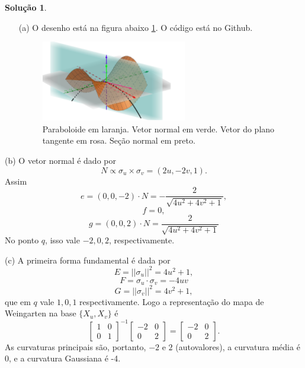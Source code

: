 \documentclass[a4paper,12pt]{article}
\theoremstyle{exer}
\theoremstyle{definition}
\newtheorem{solution}{Solução}
\theoremstyle{plain}
\begin{document}
\begin{solution}
    \begin{enumerate}
        \item[(a)] O desenho está na figura abaixo \ref{fig:paraboloid}. O
        código está no Github. 
        
        \begin{figure}[!ht]
            \centering
            \includegraphics[width=0.6\textwidth]{images/paraboloide.png}
            \caption{Paraboloide em laranja. Vetor normal em verde. Vetor do plano tangente em rosa. Seção normal em preto.}
            \label{fig:paraboloid}
        \end{figure}
    \end{enumerate}

    \item[(b)] O vetor normal é dado por 
    $$
    N \propto \sigma_u \times \sigma_v = (2u, -2v, 1).
    $$
    Assim
    $$
    e = (0,0,-2)\cdot N = -\frac{2}{\sqrt{4u^2+4v^2+1}},
    $$
    $$
    f = 0,
    $$
    $$
    g = (0,0,2)\cdot N = \frac{2}{\sqrt{4u^2+4v^2+1}}
    $$
    No ponto $q$, isso vale $-2,0,2$, respectivamente. 

    \item[(c)] A primeira forma fundamental é dada por 
    $$
    E = ||\sigma_u||^2 = 4u^2 + 1, 
    $$
    $$
    F = \sigma_u \cdot \sigma_v = -4uv
    $$
    $$
    G = ||\sigma_v||^2 = 4v^2 + 1, 
    $$
    que em $q$ vale $1,0,1$ respectivamente. Logo a representação do mapa de
    Weingarten na base $\{X_u, X_v\}$ é 
    $$
    \begin{bmatrix}
        1 & 0 \\ 0 & 1
    \end{bmatrix}^{-1}\begin{bmatrix}
        -2 & 0 \\ 0 & 2 
    \end{bmatrix} = \begin{bmatrix}
        -2 & 0 \\ 0 & 2 
    \end{bmatrix}.
    $$
    As curvaturas principais são, portanto, $-2$ e $2$ (autovalores), a
    curvatura média é 0, e a curvatura Gaussiana é -4. 
\end{solution}
\end{document}
